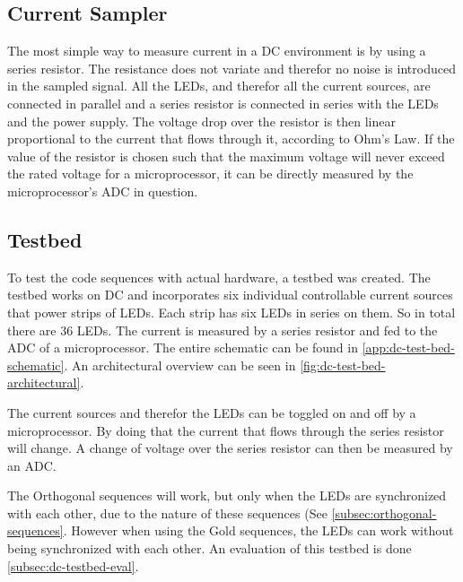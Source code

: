 








\subsection{Current Sampler}

The most simple way to measure current in a DC environment is by using a series resistor.
The resistance does not variate and therefor no noise is introduced in the sampled signal.
All the LEDs, and therefor all the current sources, are connected in parallel and a series resistor is connected in series with the LEDs and the power supply.
The voltage drop over the resistor is then linear proportional to the current that flows through it, according to Ohm's Law.
If the value of the resistor is chosen such that the maximum voltage will never exceed the rated voltage for a microprocessor, it can be directly measured by the microprocessor's ADC in question.









\subsection{Testbed}
\label{subsec:dc-testbed}

To test the code sequences with actual hardware, a testbed was created.
The testbed works on DC and incorporates six individual controllable current sources that power strips of LEDs.
Each strip has six LEDs in series on them.
So in total there are 36 LEDs.
The current is measured by a series resistor and fed to the ADC of a microprocessor.
The entire schematic can be found in \autoref{app:dc-test-bed-schematic}. 
An architectural overview can be seen in \autoref{fig:dc-test-bed-architectural}.


The current sources and therefor the LEDs can be toggled on and off by a microprocessor.
By doing that the current that flows through the series resistor will change.
A change of voltage over the series resistor can then be measured by an ADC.


The Orthogonal sequences will work, but only when the LEDs are synchronized with each other, due to the nature of these sequences (See \autoref{subsec:orthogonal-sequences}.
However when using the Gold sequences, the LEDs can work without being synchronized with each other.
An evaluation of this testbed is done \autoref{subsec:dc-testbed-eval}.

